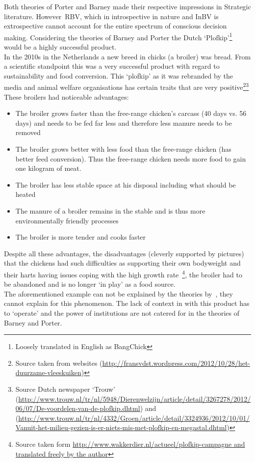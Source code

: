 Both theories of Porter and Barney made their respective impressions in Strategic literature.  However~\gls{RBV}, which in introspective in nature and \gls{InBV} is extrospective cannot account for the entire spectrum of conscious decision making.
Considering the theories of Barney and Porter the Dutch `Plofkip'\footnote{Loosely translated in English as BangChick} would be a highly successful product.\\
In the 2010s in the Netherlands a new breed in chicks (a broiler) was bread. From a scientific standpoint this was a very successful product with regard to sustainability and food conversion. 
This `plofkip' as it was rebranded by the media and animal welfare organisations has certain traits that are very positive\footnote{Source taken from websites (\url{http://fransvdst.wordpress.com/2012/10/28/het-duurzame-vleeskuiken})}\footnote{Source Dutch newspaper `Trouw'
(\url{http://www.trouw.nl/tr/nl/5948/Dierenwelzijn/article/detail/3267278/2012/06/07/De-voordelen-van-de-plofkip.dhtml}) 
and (\url{http://www.trouw.nl/tr/nl/4332/Groen/article/detail/3324936/2012/10/01/Vanuit-het-milieu-gezien-is-er-niets-mis-met-plofkip-en-megastal.dhtml})}
These broilers had noticeable advantages:

\begin{itemize}
 \setlength{\itemsep}{0.75pt}
\item The broiler grows faster than the free-range chicken's carcass (40 days vs. 56 days) and needs to be fed far less and therefore less manure needs to be removed
 \item    The broiler grows better with less food than the free-range chicken (has better feed conversion). Thus the free-range chicken needs more food to gain one kilogram of meat.
\item     The broiler has less stable space at his disposal including what should be heated
\item     The manure of a broiler remains in the stable and is thus more environmentally friendly processes
  \item   The broiler is more tender and cooks faster
\end{itemize}
Despite all these advantages, the disadvantages (cleverly supported by pictures) that the chickens had such difficulties as supporting their own bodyweight and their harts having issues coping with the high growth rate~\footnote{Source taken form \url{http://www.wakkerdier.nl/actueel/plofkip-campagne and translated freely by the author}}, the broiler had to be abandoned and is no longer `in play' as a food source.\\
The aforementioned example can not be explained by the theories by~\cite{Porter:1980,Barney:1991}, they cannot explain for this phenomenon. 
The lack of context in with this product has to `operate'  and the power of institutions are not catered for in the theories of Barney and Porter.